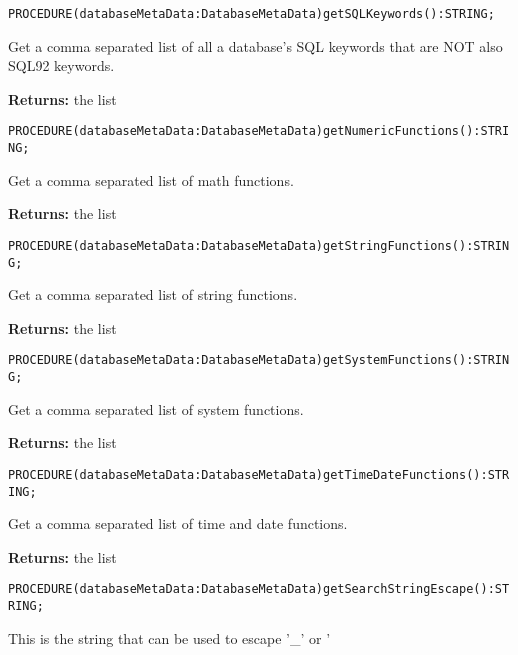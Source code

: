 

\verb'PROCEDURE(databaseMetaData:DatabaseMetaData)getSQLKeywords():STRING;'






Get a comma separated list of all a database's SQL keywords that are NOT also SQL92 keywords. 


{\bf Returns: } 
the list 




\verb'PROCEDURE(databaseMetaData:DatabaseMetaData)getNumericFunctions():STRING;'






Get a comma separated list of math functions. 


{\bf Returns: } 
the list 




\verb'PROCEDURE(databaseMetaData:DatabaseMetaData)getStringFunctions():STRING;'






Get a comma separated list of string functions. 


{\bf Returns: } 
the list 




\verb'PROCEDURE(databaseMetaData:DatabaseMetaData)getSystemFunctions():STRING;'






Get a comma separated list of system functions. 


{\bf Returns: } 
the list 




\verb'PROCEDURE(databaseMetaData:DatabaseMetaData)getTimeDateFunctions():STRING;'






Get a comma separated list of time and date functions. 


{\bf Returns: } 
the list 




\verb'PROCEDURE(databaseMetaData:DatabaseMetaData)getSearchStringEscape():STRING;'






This is the string that can be used to escape '\_' or '%

